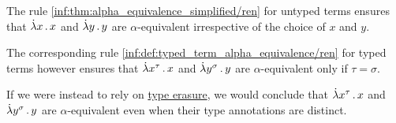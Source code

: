 \begin{example}\label{ex:def:typed_term_alpha_equivalence}
  The rule \ref{inf:thm:alpha_equivalence_simplified/ren} for untyped terms ensures that \( \qabs x x \) and \( \qabs y y \) are \( \alpha \)-equivalent irrespective of the choice of \( x \) and \( y \).

  The corresponding rule \ref{inf:def:typed_term_alpha_equivalence/ren} for typed terms however ensures that \( \qabs {x^\tau} x \) and \( \qabs {y^\sigma} y \) are \( \alpha \)-equivalent only if \( \tau = \sigma \).

  If we were instead to rely on \hyperref[alg:type_erasure]{type erasure}, we would conclude that \( \qabs {x^\tau} x \) and \( \qabs {y^\sigma} y \) are \( \alpha \)-equivalent even when their type annotations are distinct.
\end{example}

